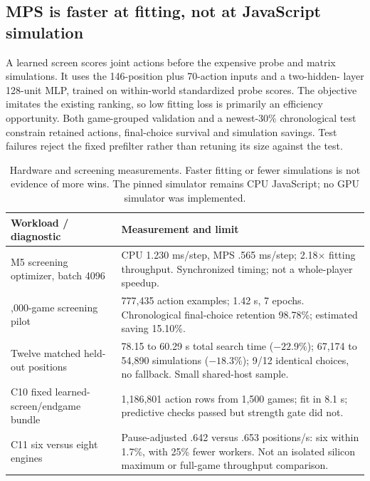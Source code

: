 
\subsection{MPS is faster at fitting, not at JavaScript simulation}
A learned screen scores joint actions before the expensive probe and matrix
simulations. It uses the 146-position plus 70-action inputs and a two-hidden-
layer 128-unit MLP, trained on within-world standardized probe scores. The
objective imitates the existing ranking, so low fitting loss is primarily an
efficiency opportunity. Both game-grouped validation and a newest-30\%
chronological test constrain retained actions, final-choice survival and
simulation savings. Test failures reject the fixed prefilter rather than
retuning its size against the test.

\begin{table}[htbp]
\centering\small
\begin{tabularx}{\linewidth}{>{\raggedright\arraybackslash}p{.43\linewidth} X}
\toprule
Workload / diagnostic & Measurement and limit \\
\midrule
M5 screening optimizer, batch 4096 & CPU 1.230 ms/step, MPS .565 ms/step;
2.18$\times$ fitting throughput. Synchronized timing; not a whole-player speedup. \\
1,000-game screening pilot & 777,435 action examples; 1.42 s, 7 epochs.
Chronological final-choice retention 98.78\%; estimated saving 15.10\%. \\
Twelve matched held-out positions & 78.15 to 60.29 s total search time
($-22.9\%$); 67,174 to 54,890 simulations ($-18.3\%$); 9/12 identical
choices, no fallback. Small shared-host sample. \\
C10 fixed learned-screen/endgame bundle & 1,186,801 action rows from 1,500
games; fit in 8.1 s; predictive checks passed but strength gate did not. \\
C11 six versus eight engines & Pause-adjusted .642 versus .653
positions/s: six within 1.7\%, with 25\% fewer workers. Not an isolated
silicon maximum or full-game throughput comparison. \\
\bottomrule
\end{tabularx}
\caption{Hardware and screening measurements. Faster fitting or fewer
simulations is not evidence of more wins. The pinned simulator remains CPU
JavaScript; no GPU simulator was implemented.}
\label{tab:modern-compute}
\end{table}

